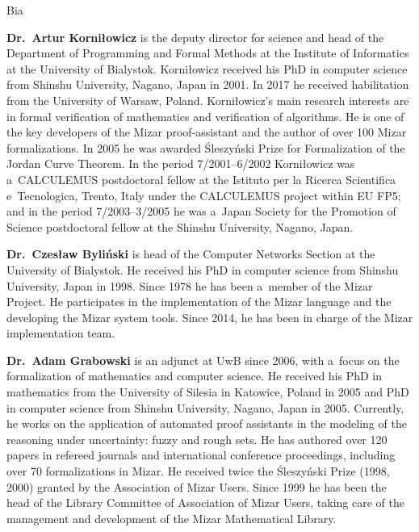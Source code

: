 \begin{sitedescription}{Bia}
\begin{compactitem}
\item\textbf{Dr.\ Artur Korniłowicz} is the deputy director for science 
and head of the Department of Programming and Formal Methods
at the Institute of Informatics at the University of Bialystok.
Korniłowicz received his PhD in computer science from Shinshu University, Nagano, Japan in 2001.
In 2017 he received habilitation from the University of Warsaw, Poland.
Korniłowicz's main research interests are in formal verification of mathematics and verification of algorithms.
He is one of the key developers of the Mizar proof-assistant and the author of over 100 Mizar formalizations.
In 2005 he was awarded Śleszyński Prize for Formalization of the Jordan Curve Theorem.
In the period 7/2001--6/2002 Korniłowicz was a~CALCULEMUS postdoctoral fellow
at the Istituto per la Ricerca Scientifica e~Tecnologica, Trento, Italy under the CALCULEMUS project within EU FP5;
and in the period 7/2003--3/2005 he was a~Japan Society for the Promotion of Science 
postdoctoral fellow at the Shinshu University, Nagano, Japan.

\item\textbf{Dr.\ Czesław Byliński} is head of the Computer Networks Section at the University of Bialystok.
He received his PhD in computer science from Shinshu University, Japan in 1998.
Since 1978 he has been a~member of the Mizar Project.
He participates in the implementation of the Mizar language and the developing the Mizar system tools. 
Since 2014, he has been in charge of the Mizar implementation team.

\item\textbf{Dr.\ Adam Grabowski} is an adjunct at UwB since 2006, 
with a~focus on the formalization of mathematics and computer science.
He received his PhD in mathematics from the University of Silesia in Katowice, Poland in 2005 
and PhD in computer science from Shinshu University, Nagano, Japan in 2005.
Currently, he works on the application of automated proof assistants
in the modeling of the reasoning under uncertainty: fuzzy and rough sets.
He has authored over 120 papers in refereed journals and international conference
proceedings, including over 70 formalizations in Mizar.
He received twice the Śleszyński Prize (1998, 2000) granted by the Association of Mizar Users.
Since 1999 he has been the head of the Library Committee of Association of Mizar Users, taking care of
the management and development of the Mizar Mathematical Library.


\end{compactitem}
\end{sitedescription}
